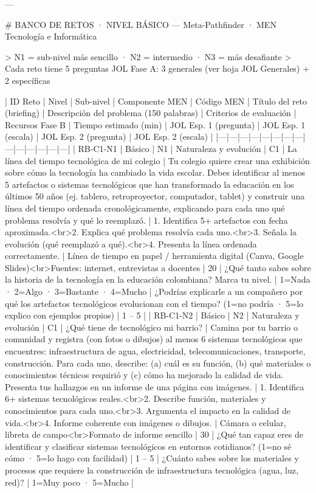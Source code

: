 ---

# BANCO DE RETOS · NIVEL BÁSICO — Meta-Pathfinder · MEN Tecnología e Informática

> N1 = sub-nivel más sencillo · N2 = intermedio · N3 = más desafiante  
> Cada reto tiene 5 preguntas JOL Fase A: 3 generales (ver hoja JOL Generales) + 2 específicas

| ID Reto | Nivel | Sub-nivel | Componente MEN | Código MEN | Título del reto (briefing) | Descripción del problema (150 palabras) | Criterios de evaluación | Recursos Fase B | Tiempo estimado (min) | JOL Esp. 1 (pregunta) | JOL Esp. 1 (escala) | JOL Esp. 2 (pregunta) | JOL Esp. 2 (escala) |
|---|---|---|---|---|---|---|---|---|---|---|---|---|---|
| RB-C1-N1 | Básico | N1 | Naturaleza y evolución | C1 | La línea del tiempo tecnológica de mi colegio | Tu colegio quiere crear una exhibición sobre cómo la tecnología ha cambiado la vida escolar. Debes identificar al menos 5 artefactos o sistemas tecnológicos que han transformado la educación en los últimos 50 años (ej. tablero, retroproyector, computador, tablet) y construir una línea del tiempo ordenada cronológicamente, explicando para cada uno qué problema resolvía y qué lo reemplazó. | 1. Identifica 5+ artefactos con fecha aproximada.<br>2. Explica qué problema resolvía cada uno.<br>3. Señala la evolución (qué reemplazó a qué).<br>4. Presenta la línea ordenada correctamente. | Línea de tiempo en papel / herramienta digital (Canva, Google Slides)<br>Fuentes: internet, entrevistas a docentes | 20 | ¿Qué tanto sabes sobre la historia de la tecnología en la educación colombiana? Marca tu nivel. | 1=Nada · 2=Algo · 3=Bastante · 4=Mucho | ¿Podrías explicarle a un compañero por qué los artefactos tecnológicos evolucionan con el tiempo? (1=no podría · 5=lo explico con ejemplos propios) | 1 – 5 |
| RB-C1-N2 | Básico | N2 | Naturaleza y evolución | C1 | ¿Qué tiene de tecnológico mi barrio? | Camina por tu barrio o comunidad y registra (con fotos o dibujos) al menos 6 sistemas tecnológicos que encuentres: infraestructura de agua, electricidad, telecomunicaciones, transporte, construcción. Para cada uno, describe: (a) cuál es su función, (b) qué materiales o conocimientos técnicos requirió y (c) cómo ha mejorado la calidad de vida. Presenta tus hallazgos en un informe de una página con imágenes. | 1. Identifica 6+ sistemas tecnológicos reales.<br>2. Describe función, materiales y conocimientos para cada uno.<br>3. Argumenta el impacto en la calidad de vida.<br>4. Informe coherente con imágenes o dibujos. | Cámara o celular, libreta de campo<br>Formato de informe sencillo | 30 | ¿Qué tan capaz eres de identificar y clasificar sistemas tecnológicos en entornos cotidianos? (1=no sé cómo · 5=lo hago con facilidad) | 1 – 5 | ¿Cuánto sabes sobre los materiales y procesos que requiere la construcción de infraestructura tecnológica (agua, luz, red)? | 1=Muy poco · 5=Mucho |

